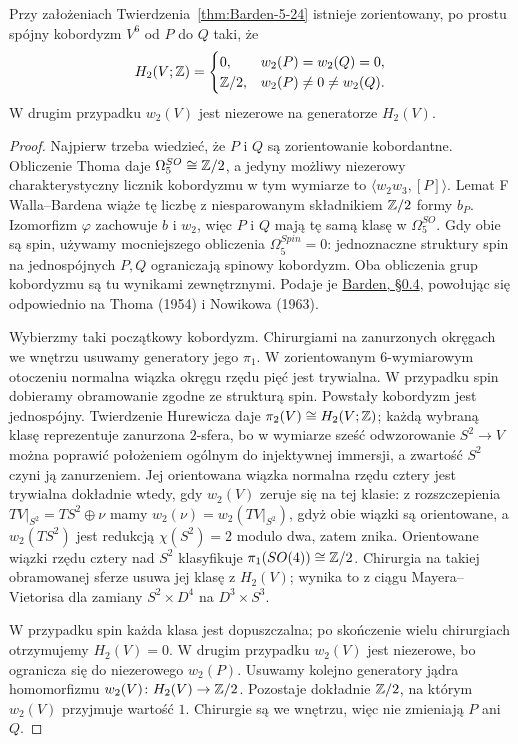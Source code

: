 \begin{lemat}
\label{lem:barden-start-24}
Przy założeniach Twierdzenia~\ref{thm:Barden-5-24}
istnieje zorientowany, po prostu spójny
kobordyzm $V^6$ od $P$ do $Q$ taki, że
\[
 H_2(V;\mathbb{Z})=
 \begin{cases}
 0,&w_2(P)=w_2(Q)=0,\\
 \mathbb{Z}/2,&w_2(P)\ne0\ne w_2(Q).
 \end{cases}
\]
W drugim przypadku $w_2(V)$ jest
niezerowe na generatorze $H_2(V)$.
\end{lemat}
\begin{proof}
Najpierw trzeba wiedzieć, że $P$ i $Q$
są zorientowanie kobordantne.
Obliczenie Thoma daje
$\Omega^{SO}_5\cong\mathbb{Z}/2$, a jedyny
możliwy niezerowy charakterystyczny
licznik kobordyzmu w tym wymiarze to
$\langle w_2w_3,[P]\rangle$.
Lemat F Walla--Bardena wiąże tę liczbę
z niesparowanym składnikiem $\mathbb{Z}/2$
formy $b_P$. Izomorfizm $\varphi$
zachowuje $b$ i $w_2$, więc $P$ i $Q$
mają tę samą klasę w $\Omega^{SO}_5$.
Gdy obie są spin, używamy mocniejszego
obliczenia $\Omega^{Spin}_5=0$:
jednoznaczne struktury spin na jednospójnych
$P,Q$ ograniczają spinowy kobordyzm.
Oba obliczenia grup kobordyzmu są tu
wynikami zewnętrznymi. Podaje je
\href{https://www.sas.rochester.edu/mth/sites/doug-ravenel/otherpapers/barden.pdf}
{Barden, §0.4}, powołując się
odpowiednio na Thoma (1954) i
Nowikowa (1963).

Wybierzmy taki początkowy kobordyzm.
Chirurgiami na zanurzonych okręgach we
wnętrzu usuwamy generatory jego $\pi_1$.
W zorientowanym $6$-wymiarowym otoczeniu
normalna wiązka okręgu rzędu pięć jest
trywialna. W przypadku spin dobieramy
obramowanie zgodne ze strukturą spin.
Powstały kobordyzm jest jednospójny.
Twierdzenie Hurewicza daje
$\pi_2(V)\cong H_2(V;\mathbb{Z})$; każdą
wybraną klasę reprezentuje zanurzona
$2$-sfera, bo w wymiarze sześć odwzorowanie
$S^2\to V$ można poprawić położeniem
ogólnym do injektywnej immersji,
a zwartość $S^2$ czyni ją zanurzeniem.
Jej orientowana
wiązka normalna rzędu cztery jest
trywialna dokładnie wtedy, gdy
$w_2(V)$ zeruje się na tej klasie:
z rozszczepienia $TV|_{S^2}=TS^2\oplus\nu$ mamy
$w_2(\nu)=w_2(TV|_{S^2})$, gdyż obie wiązki są
orientowane, a $w_2(TS^2)$ jest redukcją
$\chi(S^2)=2$ modulo dwa, zatem znika.
Orientowane wiązki rzędu cztery nad $S^2$ klasyfikuje
$\pi_1(SO(4))\cong\mathbb{Z}/2$.
Chirurgia na takiej obramowanej sferze
usuwa jej klasę z $H_2(V)$; wynika to
z ciągu Mayera--Vietorisa dla zamiany
$S^2\times D^4$ na $D^3\times S^3$.

W przypadku spin każda klasa jest
dopuszczalna; po skończenie wielu
chirurgiach otrzymujemy $H_2(V)=0$.
W drugim przypadku $w_2(V)$ jest
niezerowe, bo ogranicza się do
niezerowego $w_2(P)$. Usuwamy kolejno
generatory jądra homomorfizmu
$w_2(V)\colon H_2(V)\to\mathbb{Z}/2$.
Pozostaje dokładnie $\mathbb{Z}/2$, na którym
$w_2(V)$ przyjmuje wartość $1$.
Chirurgie są we wnętrzu, więc nie
zmieniają $P$ ani $Q$.
\end{proof}

